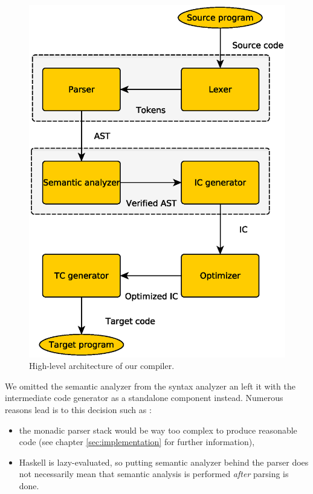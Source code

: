 \documentclass[titlepage]{article}
\begin{document}
\begin{figure}[h!]
	\centering
	\includegraphics[scale=0.5]{figures/compilerArchitecture}
	\caption{High-level architecture of our compiler.}
	\label{fig:architecture}
\end{figure}

We omitted the semantic analyzer from the syntax analyzer an left it with the intermediate
code generator as a standalone component instead. Numerous reasons lead is to this decision 
such as :

\begin{itemize}
	\item the monadic parser stack would be way too complex to produce reasonable code
		(see chapter \ref{sec:implementation} for further information),
	\item Haskell is lazy-evaluated, so putting semantic analyzer behind the parser does
		not necessarily mean that semantic analysis is performed \textit{after}
		parsing is done.
\end{itemize}
\end{document}
